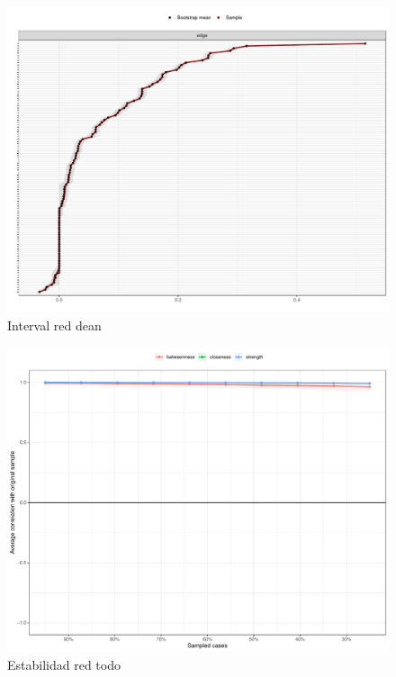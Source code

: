 \documentclass[11pt,spanish]{article}\usepackage[]{graphicx}\usepackage[]{color}
\begin{document}
\begin{figure}[ht]
\centering
\includegraphics[scale=0.5]{images/interval_dean.pdf}
\caption{Interval red dean}
\label{fig:interval_dean}
\end{figure}


\begin{figure}[ht]
\centering
\includegraphics[scale=0.5]{images/estability_todo.pdf}
\caption{Estabilidad red todo}
\label{fig:estabilidad_todo}
\end{figure}
\end{document}
